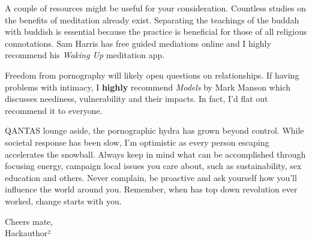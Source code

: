 \documentclass[easypeasy.tex]{subfiles}
\begin{document}
A couple of resources might be useful for your consideration. Countless studies on the benefits of meditation already exist. Separating the teachings of the buddah with buddish is essential because the practice is beneficial for those of all religious connotations. Sam Harris has free guided mediations online and I highly recommend his \textit{Waking Up} meditation app.

Freedom from pornography will likely open questions on relationships. If having problems with intimacy, I \textbf{highly} recommend \textit{Models} by Mark Manson which discusses neediness, vulnerability and their impacts. In fact, I'd flat out recommend it to everyone.

QANTAS lounge aside, the pornographic hydra has grown beyond control. While societal response has been slow, I'm optimistic as every person escaping accelerates the snowball. Always keep in mind what can be accomplished through focusing energy, campaign local issues you care about, such as sustainability, sex education and others. Never complain, be proactive and ask yourself how you'll influence the world around you. Remember, when has top down revolution ever worked, change starts with you.

Cheers mate, \\
Hackauthor²
\end{document}

